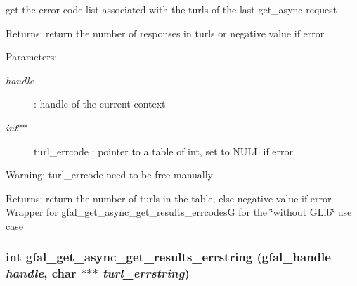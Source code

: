get the error code list associated with the turls of the last get\_\-async request \begin{Desc}
\item[Returns:]return the number of responses in turls or negative value if error \end{Desc}
\begin{Desc}
\item[Parameters:]
\begin{description}
\item[{\em handle}]: handle of the current context \item[{\em int$\ast$$\ast$}]turl\_\-errcode : pointer to a table of int, set to NULL if error \end{description}
\end{Desc}
\begin{Desc}
\item[Warning:]turl\_\-errcode need to be free manually \end{Desc}
\begin{Desc}
\item[Returns:]return the number of turls in the table, else negative value if error Wrapper for gfal\_\-get\_\-async\_\-get\_\-results\_\-errcodes\-G for the \char`\"{}without GLib\char`\"{} use case \end{Desc}
\subsubsection{\setlength{\rightskip}{0pt plus 5cm}int gfal\_\-get\_\-async\_\-get\_\-results\_\-errstring (gfal\_\-handle {\em handle}, char $\ast$$\ast$$\ast$ {\em turl\_\-errstring})}\label{gfal__common__interface_8c_ecd7d68b18088ff620d21dbef85862ae}


